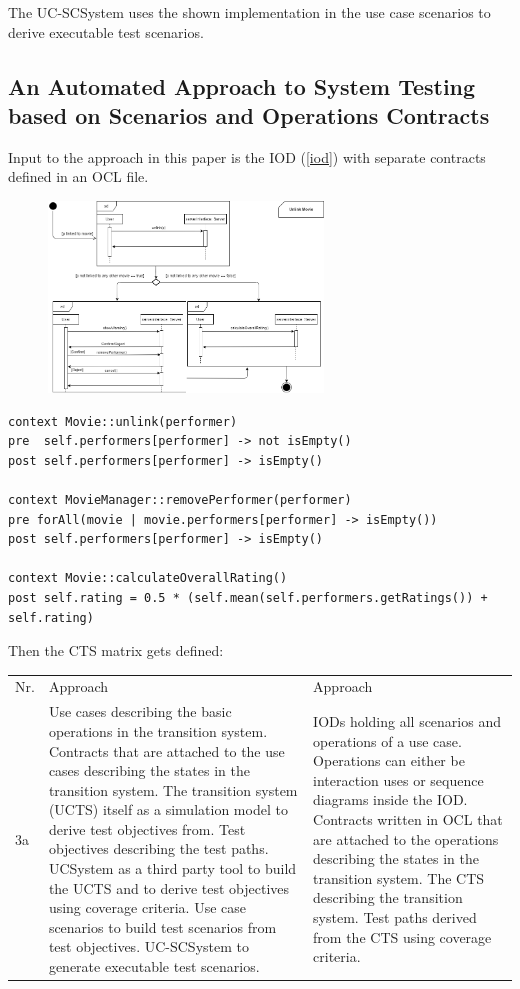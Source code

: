 The UC-SCSystem uses the shown implementation in the use case scenarios to derive executable test scenarios. 

\subsection{An Automated Approach to System Testing based on Scenarios and Operations Contracts}

Input to the approach in this paper is the IOD (\autoref{iod}) with separate contracts defined in an OCL file. 

\begin{figure}[h]
	\centering
	\includegraphics[width=0.65\textwidth]{img/iod.png}
	\label{iod}
\end{figure}

\begin{lstlisting}
context Movie::unlink(performer)
pre  self.performers[performer] -> not isEmpty()
post self.performers[performer] -> isEmpty()

context MovieManager::removePerformer(performer)
pre forAll(movie | movie.performers[performer] -> isEmpty())
post self.performers[performer] -> isEmpty()

context Movie::calculateOverallRating()
post self.rating = 0.5 * (self.mean(self.performers.getRatings()) + self.rating)
\end{lstlisting}

Then the CTS matrix gets defined:

\begin{longtable}[h]{p{0.5cm}p{}p{}}
	Nr. & Approach \cite{ansatz.2006} & Approach \cite{ansatz.2007} \\
	3a & 
	Use cases describing the basic operations in the transition system. Contracts that are attached to the use cases describing the states in the transition system. The transition system (UCTS) itself as a simulation model to derive test objectives from. Test objectives describing the test paths. UCSystem as a third party tool to build the UCTS and to derive test objectives using coverage criteria. Use case scenarios to build test scenarios from test objectives. UC-SCSystem to generate executable test scenarios.  & 
	IODs holding all scenarios and operations of a use case. Operations can either be interaction uses or sequence diagrams inside the IOD. Contracts written in OCL that are attached to the operations describing the states in the transition system. The CTS describing the transition system. Test paths derived from the CTS using coverage criteria.  \\
\end{longtable}